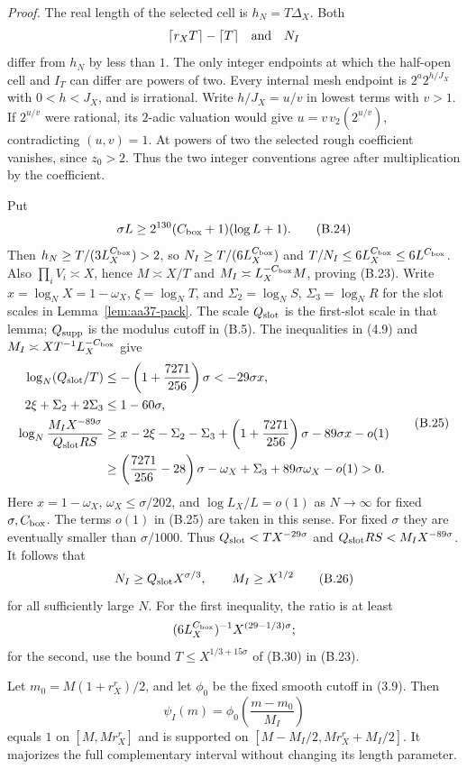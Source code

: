 \emph{Proof.} The real length of the selected cell is
$h_N=T\Delta_X$. Both
\[
 \lceil r_XT\rceil-\lceil T\rceil
 \quad\hbox{and}\quad
 N_I
\]
differ from $h_N$ by less than $1$. The only integer endpoints at
which the half-open cell and $I_T$ can differ are powers of two.
Every internal mesh endpoint is $2^a2^{h/J_X}$ with
$0<h<J_X$, and is irrational. Write $h/J_X=u/v$ in lowest terms with
$v>1$. If $2^{u/v}$ were rational, its $2$-adic valuation would give
$u=v\,v_2(2^{u/v})$, contradicting $(u,v)=1$. At powers of two the
selected rough coefficient vanishes, since $z_0>2$. Thus the two
integer conventions agree after multiplication by the coefficient.

Put
\[
 \sigma L\ge2^{130}(C_{\rm box}+1)(\log L+1).
 \tag{B.24}
\]
Then $h_N\ge T/(3L_X^{C_{\rm box}})>2$, so
$N_I\ge T/(6L_X^{C_{\rm box}})$ and
$T/N_I\le6L_X^{C_{\rm box}}\le6L^{C_{\rm box}}$. Also
$\prod_i V_i\asymp X$, hence $M\asymp X/T$ and
$M_I\asymp L_X^{-C_{\rm box}}M$, proving (B.23).
Write $x=\log_NX=1-\omega_X$, $\xi=\log_NT$, and
$\Sigma_2=\log_NS$, $\Sigma_3=\log_NR$ for the slot scales in
Lemma~\ref{lem:aa37-pack}. The scale $Q_{\rm slot}$ is the first-slot
scale in that lemma; $Q_{\rm supp}$ is the modulus cutoff in (B.5).
The inequalities in (4.9) and $M_I\asymp XT^{-1}L_X^{-C_{\rm box}}$
give
\[
\begin{aligned}
 \log_N(Q_{\rm slot}/T)
 &\le-\left(1+\frac{7271}{256}\right)\sigma<-29\sigma x,\\
 2\xi+\Sigma_2+2\Sigma_3&\le1-60\sigma,\\
 \log_N\frac{M_I X^{-89\sigma}}{Q_{\rm slot}RS}
 &\ge x-2\xi-\Sigma_2-\Sigma_3
   +\left(1+\frac{7271}{256}\right)\sigma
   -89\sigma x-o(1)\\
 &\ge \left(\frac{7271}{256}-28\right)\sigma
   -\omega_X+\Sigma_3+89\sigma\omega_X-o(1)>0.
\end{aligned}
\tag{B.25}
\]
Here $x=1-\omega_X$, $\omega_X\le\sigma/202$, and
$\log L_X/L=o(1)$ as $N\to\infty$ for fixed $\sigma,C_{\rm box}$.
The terms $o(1)$ in (B.25) are taken in this sense. For fixed $\sigma$
they are eventually smaller than $\sigma/1000$. Thus
$Q_{\rm slot}<TX^{-29\sigma}$ and
$Q_{\rm slot}RS<M_IX^{-89\sigma}$.
It follows that
\[
 N_I\ge Q_{\rm slot}X^{\sigma/3},\qquad M_I\ge X^{1/2}
 \tag{B.26}
\]
for all sufficiently large $N$. For the first inequality, the ratio
is at least
\[
 (6L_X^{C_{\rm box}})^{-1}X^{(29-1/3)\sigma};
\]
for the second, use the bound $T\le X^{1/3+15\sigma}$ of (B.30) in (B.23).

Let $m_0=M(1+r_X^r)/2$, and let $\phi_0$ be the fixed smooth cutoff in
(3.9). Then
\[
 \psi_I(m)=\phi_0\!\left(\frac{m-m_0}{M_I}\right)
\]
equals $1$ on $[M,Mr_X^r]$ and is supported on
$[M-M_I/2,Mr_X^r+M_I/2]$. It majorizes the full complementary
interval without changing its length parameter.

